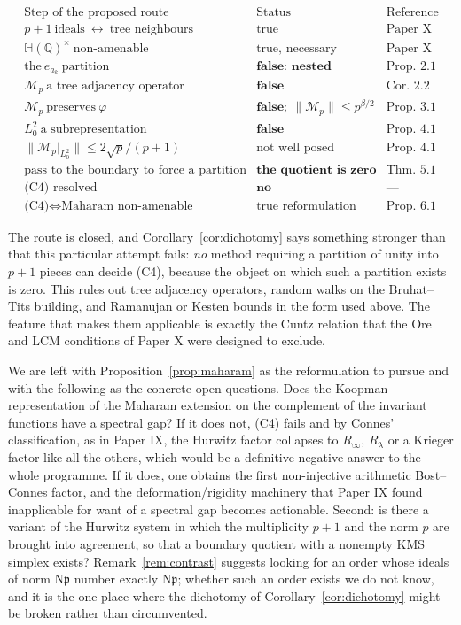 \documentclass[11pt]{amsart}
\numberwithin{equation}{section}
\theoremstyle{definition}
\theoremstyle{remark}
\newcommand{\Q}{\mathbb{Q}}
\newcommand{\HH}{\mathbb{H}}
\newcommand{\cM}{\mathcal{M}}
\newcommand{\Ns}{\mathrm{N}}
\newcommand{\pp}{\mathfrak{p}}
\begin{document}
\[
\begin{array}{lll}
\text{Step of the proposed route} & \text{Status} & \text{Reference}\\\hline
p+1\ \text{ideals}\ \leftrightarrow\ \text{tree neighbours} & \text{true} & \text{Paper X}\\
\HH(\Q)^\times\ \text{non-amenable} & \text{true, necessary} & \text{Paper X}\\
\text{the}\ e_{a_k}\ \text{partition} & \textbf{false: nested} & \text{Prop.~2.1}\\
\cM_p\ \text{a tree adjacency operator} & \textbf{false} & \text{Cor.~2.2}\\
\cM_p\ \text{preserves}\ \varphi & \textbf{false};\ \|\cM_p\|\le p^{\beta/2} & \text{Prop.~3.1}\\
L^2_0\ \text{a subrepresentation} & \textbf{false} & \text{Prop.~4.1}\\
\|\cM_p|_{L^2_0}\|\le2\sqrt p/(p+1) & \text{not well posed} & \text{Prop.~4.1}\\
\text{pass to the boundary to force a partition} & \textbf{the quotient is zero} & \text{Thm.~5.1}\\
\text{(C4) resolved} & \textbf{no} & \text{---}\\
\text{(C4)}\iff\text{Maharam non-amenable} & \text{true reformulation} & \text{Prop.~6.1}
\end{array}
\]

The route is closed, and Corollary~\ref{cor:dichotomy} says something stronger than that this
particular attempt fails: \emph{no} method requiring a partition of unity into $p+1$ pieces
can decide (C4), because the object on which such a partition exists is zero. This rules
out tree adjacency operators, random walks on the Bruhat--Tits building, and Ramanujan or
Kesten bounds in the form used above. The feature that makes them applicable is exactly the
Cuntz relation that the Ore and LCM conditions of Paper X were designed to exclude.

We are left with Proposition~\ref{prop:maharam} as the reformulation to pursue and with the
following as the concrete open questions. Does the Koopman representation of the Maharam
extension on the complement of the invariant functions have a spectral gap? If it does not,
(C4) fails and by Connes' classification, as in Paper IX, the Hurwitz factor collapses to
$R_\infty$, $R_\lambda$ or a Krieger factor like all the others, which would be a definitive
negative answer to the whole programme. If it does, one obtains the first non-injective
arithmetic Bost--Connes factor, and the deformation/rigidity machinery that Paper IX found
inapplicable for want of a spectral gap becomes actionable. Second: is there a variant of the Hurwitz
system in which the multiplicity $p+1$ and the norm $p$ are brought into agreement, so that a
boundary quotient with a nonempty KMS simplex exists? Remark~\ref{rem:contrast} suggests
looking for an order whose ideals of norm $\Ns\pp$ number exactly $\Ns\pp$; whether such an
order exists we do not know, and it is the one place where the dichotomy of
Corollary~\ref{cor:dichotomy} might be broken rather than circumvented.
\end{document}
